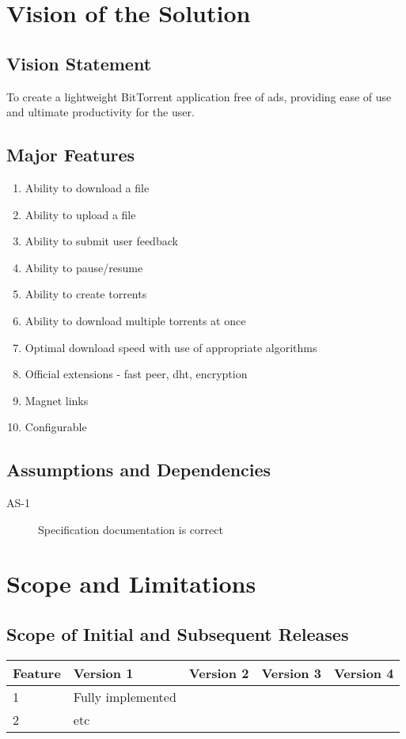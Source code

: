 \documentclass[letter]{scrartcl}
\begin{document}
\section{Vision of the Solution}
\subsection{Vision Statement}
To create a lightweight BitTorrent application free of ads, providing ease of use and ultimate productivity for the user.
\subsection{Major Features}
\begin{enumerate}
\item Ability to download a file
\item Ability to upload a file
\item Ability to submit user feedback
\item Ability to pause/resume
\item Ability to create torrents
\item Ability to download multiple torrents at once
\item Optimal download speed with use of appropriate algorithms
\item Official extensions - fast peer, dht, encryption
\item Magnet links
\item Configurable
\end{enumerate}

\subsection{Assumptions and Dependencies}
\begin{description}
\item[AS-1] Specification documentation is correct
\end{description}

\section{Scope and Limitations}
\subsection{Scope of Initial and Subsequent Releases}
\begin{tabular}{| l | l | l | l | l |}
\hline
\textbf{Feature} & \textbf{Version 1} & \textbf{Version 2} & \textbf{Version 3} & \textbf{Version 4} \\
\hline
\hline
1 & Fully implemented & & & \\
\hline
2 & etc & & & \\
\hline
\end{tabular}
\end{document}
